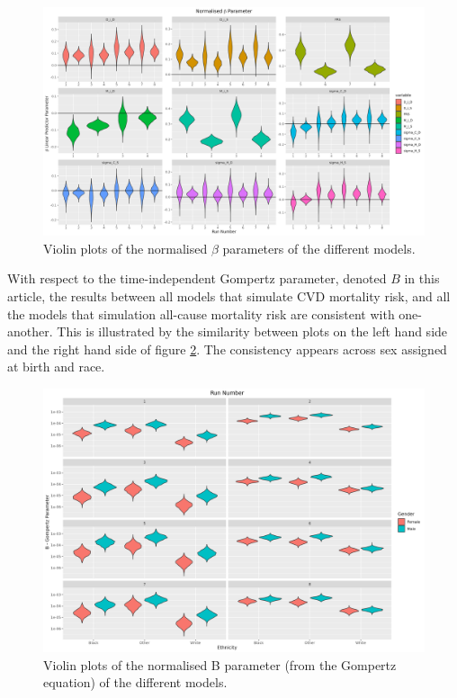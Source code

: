 \documentclass[
]{article}
\begin{document}
\begin{figure}
\centering
\includegraphics{./Plots/beta/Beta_parameter_normalised.png}
\caption{Violin plots of the normalised \(\beta\) parameters of the different models.}\label{fig:betas}
\end{figure}

With respect to the time-independent Gompertz parameter, denoted \(B\) in this article, the results between all models that simulate CVD mortality risk, and all the models that simulation all-cause mortality risk are consistent with one-another. This is illustrated by the similarity between plots on the left hand side and the right hand side of figure \ref{fig:gompB}. The consistency appears across sex assigned at birth and race.

\begin{figure}
\centering
\includegraphics{./Plots/gompertz/B_parameter.png}
\caption{Violin plots of the normalised B parameter (from the Gompertz equation) of the different models.}\label{fig:gompB}
\end{figure}
\end{document}
